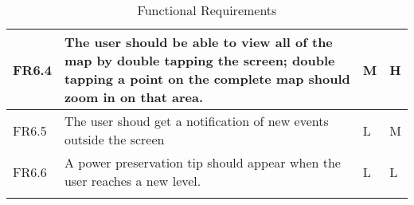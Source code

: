\begin{longtable}{| p{1.5cm} | p{8cm} | p{1.5cm} | p{2cm} |}
      FR6.4 & The user should be able to view all of the map by double tapping the screen; double tapping a 
      point on the complete map should zoom in on that area. & M & H \\ \hline

      FR6.5 & The user shoud get a notification of new events outside the screen & L & M \\ \hline

      FR6.6 & A power preservation tip should appear when the user reaches a new level. & L & L \\ \hline

   \hline
   \caption{Functional Requirements}
\end{longtable}
